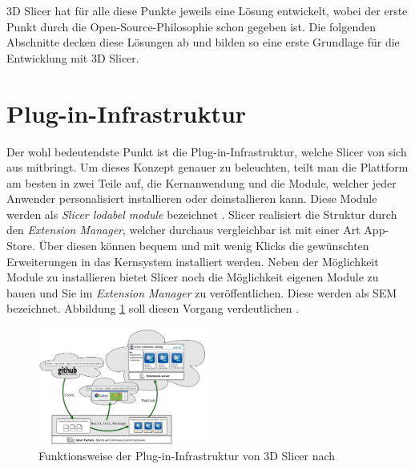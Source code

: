 3D Slicer hat für alle diese Punkte jeweils eine Lösung entwickelt, wobei der erste
Punkt durch die Open-Source-Philosophie schon gegeben ist. Die folgenden
Abschnitte decken diese Lösungen ab und bilden so eine erste Grundlage für die
Entwicklung mit 3D Slicer.

\section{Plug-in-Infrastruktur}
Der wohl bedeutendste Punkt ist die Plug-in-Infrastruktur, welche Slicer von sich
aus mitbringt. Um dieses Konzept genauer zu beleuchten, teilt man die Plattform am
besten in zwei Teile auf, die Kernanwendung und die Module, welcher jeder Anwender
personalisiert installieren oder deinstallieren kann. Diese Module werden als
\textit{Slicer lodabel module} bezeichnet \citep[vgl.][S.~1332]{fedorov2012slicer}.
Slicer realisiert die Struktur durch den \textit{Extension Manager}, welcher durchaus
vergleichbar ist mit einer Art App-Store. Über diesen können bequem und mit
wenig Klicks die gewünschten Erweiterungen in das Kernsystem installiert werden.
Neben der Möglichkeit Module zu installieren bietet Slicer noch die Möglichkeit eigenen
Module zu bauen und Sie im \textit{Extension Manager} zu veröffentlichen. Diese werden
als \ac{SEM} bezeichnet. Abbildung \ref{fig:3d_slicer_extension_index} soll diesen
Vorgang verdeutlichen \citep[vgl.][]{slicer2024}.

\begin{figure}[h]
	\centering
	\includegraphics[width=0.5\textwidth]{img/slicer_extention_index.png}
	\caption{Funktionsweise der Plug-in-Infrastruktur von 3D Slicer nach \citet{extensionsIndex2024}}
	\label{fig:3d_slicer_extension_index}
\end{figure}

